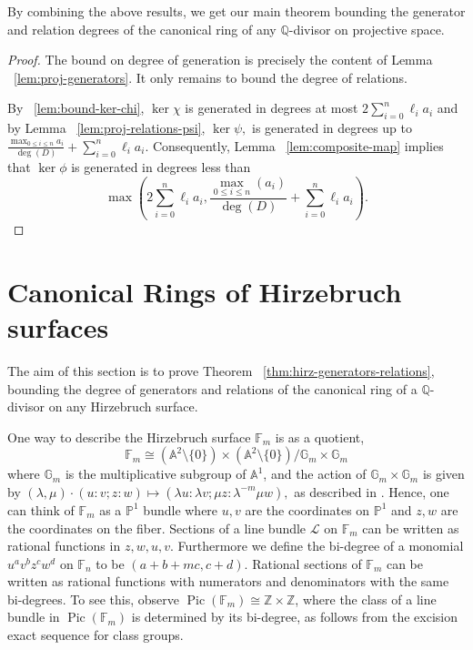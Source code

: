 \documentclass{amsart}
\theoremstyle{plain}
\theoremstyle{definition}
\theoremstyle{remark}
\numberwithin{equation}{section}
\newcommand\bq{{\mathbb Q}}
\newcommand\bp{{\mathbb P}}
\newcommand\bz{{\mathbb Z}}
\newcommand\ba{{\mathbb A}}
\newcommand\bida{a}
\newcommand\hirz{\mathbb{F}}
\DeclareMathOperator{\Pic}{Pic}
\begin{document}
By combining the above results, we get our main theorem bounding
the generator and relation degrees of the canonical ring of any
$\bq$-divisor on projective space.

\restateproj*

\begin{proof}
The bound on degree of generation is precisely the content of Lemma 
~\ref{lem:proj-generators}. It only remains to bound the degree of 
relations.

By ~\ref{lem:bound-ker-chi}, $\ker \chi$ is generated in degrees 
at most $2\sum_{i=0}^n \ell_i a_i$ and by Lemma
~\ref{lem:proj-relations-psi}, $\ker \psi,$ is generated in
degrees up to $\frac{\max_{0 \leq i \leq n} \bida_i}{\deg(D)} + \sum_{i=0}^n \ell_i a_i$. 
Consequently, Lemma ~\ref{lem:composite-map} implies that $\ker \phi$
is generated in degrees less than
\[
	\max \left(2 \sum_{i=0}^n \ell_i a_i, \frac{\max_{0\le i \le n}
	(\bida_i)}{\deg(D)} + \sum_{i=0}^n \ell_i a_i \right).
\]
\end{proof}

\section{Canonical Rings of Hirzebruch surfaces}
\label{sec:hirz}
The aim of this section is to prove Theorem
~\ref{thm:hirz-generators-relations}, bounding the degree of
generators and relations of the canonical ring of a $\bq$-divisor
on any Hirzebruch surface.

One way to describe the Hirzebruch surface $\hirz_m$ is as a
quotient,
\[
\hirz_m \cong (\ba^2 \setminus \{0\}) \times (\ba^2 \setminus \{0\})/\mathbb G_m \times \mathbb G_m
\]
where $\mathbb G_m$ is the multiplicative subgroup of $\ba^1$, and the action of $\mathbb G_m \times \mathbb G_m$ is given by
$(\lambda, \mu) \cdot (u\colon v; z\colon w) \mapsto (\lambda u\colon \lambda v; \mu z\colon \lambda^{-m} \mu w),$ as described in \cite[p.~ 6]{zhao:counting-cubic}. Hence, one can think of
$\hirz_m$ as a $\bp^1$ bundle where $u,v$ are the coordinates on
$\bp^1$ and $z,w$ are the coordinates on the fiber.
Sections of a line bundle $\mathscr L$ on $\hirz_m$ can be written as
rational functions in $z, w, u, v$.
Furthermore we define the bi-degree of a monomial $u^a v^{b} z^c w^d$
on $\hirz_n$ to be
$(a + b + mc, c + d)$. Rational sections of $\hirz_m$ can be written as
rational functions with numerators and denominators with the same bi-degrees. To see this, 
observe
$\Pic(\hirz_m) \cong \bz \times \bz$, where the class of a line bundle
in $\Pic(\hirz_m)$
is determined by its bi-degree, as follows from the excision exact sequence
for class groups.
\end{document}
